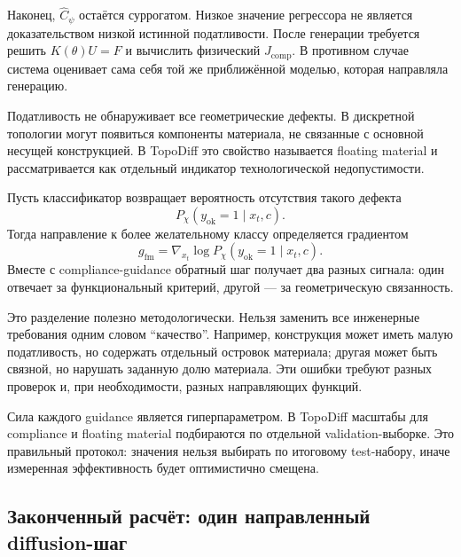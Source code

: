 Наконец, $\widehat C_\psi$ остаётся суррогатом. Низкое значение регрессора не является доказательством низкой истинной податливости. После генерации требуется решить $K(\theta)U=F$ и вычислить физический $J_{\mathrm{comp}}$. В противном случае система оценивает сама себя той же приближённой моделью, которая направляла генерацию.

Податливость не обнаруживает все геометрические дефекты. В дискретной топологии могут появиться компоненты материала, не связанные с основной несущей конструкцией. В TopoDiff это свойство называется floating material и рассматривается как отдельный индикатор технологической недопустимости.

Пусть классификатор возвращает вероятность отсутствия такого дефекта
\begin{equation}
 P_\chi(y_{\mathrm{ok}}=1\mid x_t,c).
\end{equation}
Тогда направление к более желательному классу определяется градиентом
\begin{equation}
 g_{\mathrm{fm}}
 =
 \nabla_{x_t}
 \log P_\chi(y_{\mathrm{ok}}=1\mid x_t,c).
\end{equation}
Вместе с compliance-guidance обратный шаг получает два разных сигнала: один отвечает за функциональный критерий, другой --- за геометрическую связанность.

Это разделение полезно методологически. Нельзя заменить все инженерные требования одним словом ``качество''. Например, конструкция может иметь малую податливость, но содержать отдельный островок материала; другая может быть связной, но нарушать заданную долю материала. Эти ошибки требуют разных проверок и, при необходимости, разных направляющих функций.

Сила каждого guidance является гиперпараметром. В TopoDiff масштабы для compliance и floating material подбираются по отдельной validation-выборке. Это правильный протокол: значения нельзя выбирать по итоговому test-набору, иначе измеренная эффективность будет оптимистично смещена.

\subsection{Законченный расчёт: один направленный diffusion-шаг}

